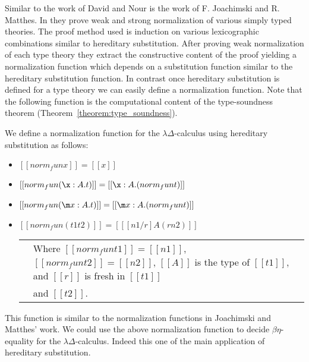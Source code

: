 Similar to the work of David and Nour is the work of F. Joachimski and
R. Matthes.  In \cite{Joachimski:1999} they prove weak and strong
normalization of various simply typed theories.  The proof method used
is induction on various lexicographic combinations similar to
hereditary substitution.  After proving weak normalization of each
type theory they extract the constructive content of the proof
yielding a normalization function which depends on a substitution
function similar to the hereditary substitution function.  In contrast
once hereditary substitution is defined for a type theory we can easily
define a normalization function. Note that the following function is 
the computational content of the type-soundness theorem 
(Theorem~\ref{theorem:type_soundness}).
\begin{definition}
  \label{def:norm_fun_hs}
  We define a normalization function for the $\lambda\Delta$-calculus using hereditary
  substitution as follows:
  \vspace{-10px}
  \begin{center}
    \begin{itemize}
    \item[] $[[ norm_fun x ]] = [[x]]$\\
    \item[] $[[norm_fun (\x:A.t)]] = [[\x:A.(norm_fun t)]]$\\
    \item[] $[[norm_fun (\m x:A.t)]] = [[\m x:A.(norm_fun t)]]$\\
    \item[] $[[norm_fun (t1 t2)]] = [[ [n1/r] A (r n2)]]$\\
      \begin{tabular}{lll}
      & Where $[[norm_fun t1]] = [[n1]]$, $[[norm_fun t2]] = [[n2]]$, $[[A]]$ is
      the type of $[[t1]]$, and $[[r]]$ is fresh in $[[t1]]$\\
      &  and $[[t2]]$.\\
    \end{tabular}
    \end{itemize}
  \end{center}
\end{definition}

This function is similar to the normalization functions in Joachimski 
and Matthes' work.  We could use the above normalization function to
decide $\beta\eta$-equality for the $\lambda\Delta$-calculus.  Indeed
this one of the main application of hereditary substitution.

